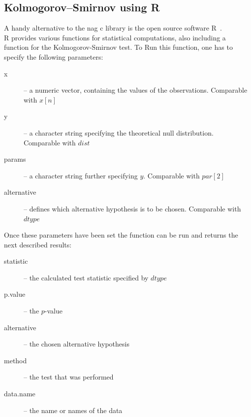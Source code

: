 \documentclass{article}
\theoremstyle{definition}
\begin{document}
\subsection{Kolmogorov–Smirnov using R}
A handy alternative to the nag c library is the open source software R~\cite{rproject}.\\
R provides various functions for statistical computations, also including a function for the Kolmogorov-Smirnov test. To Run this function, one has to specify the following parameters:
\begin{description}
\item[x] -- a numeric vector, containing the values of the observations. Comparable with $x[n]$
\item[y] -- a character string specifying the theoretical null distribution. Comparable with $dist$
\item[params]-- a character string further specifying $y$. Comparable with $par[2]$
\item[alternative]-- defines which alternative hypothesis is to be chosen. Comparable with $dtype$
\end{description}
Once these parameters have been set the function can be run and returns the next described results:
\begin{description}
\item[statistic] -- the calculated test statistic specified by $dtype$
\item[p.value] -- the $p$-value
\item[alternative] -- the chosen alternative hypothesis
\item[method] -- the test that was performed
\item[data.name] -- the name or names of the data
\end{description}
\end{document}
